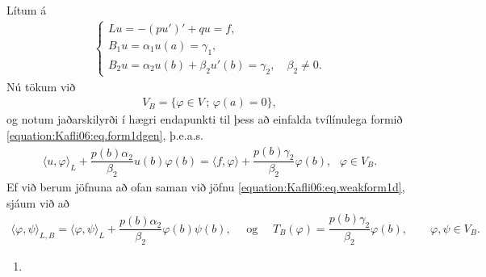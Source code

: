 \documentclass[a4paper,10pt,icelandic]{sphinxmanual}
\begin{document}
Lítum á
\begin{equation*}
\begin{split}\begin{cases}
Lu=-(pu')'+qu=f, \\
B_1u=\alpha_1u(a)=\gamma_1,  \\
B_2u=\alpha_2u(b)+{\beta}_2u'(b)=\gamma_2, \quad \beta_2\neq 0.
\end{cases}\end{split}
\end{equation*}
Nú tökum við
\begin{equation*}
\begin{split}V_B=\{\varphi\in V\,;\, \varphi(a)=0\},\end{split}
\end{equation*}
og notum jaðarskilyrði í hægri endapunkti til þess að einfalda tvílínulega formið \eqref{equation:Kafli06:eq.form1dgen}, þ.e.a.s.
\begin{equation*}
\begin{split}{{\langle u,\varphi\rangle}}_L
+\dfrac{p(b)\alpha_2}{\beta_2}u(b)\varphi(b)
={{\langle f,\varphi\rangle}}
+\dfrac{p(b)\gamma_2}{\beta_2}\varphi(b), ~~~ \varphi\in V_B.\end{split}
\end{equation*}
Ef við berum jöfnuna að ofan saman við jöfnu \eqref{equation:Kafli06:eq.weakform1d},  sjáum við að
\begin{equation*}
\begin{split}{{\langle \varphi,\psi\rangle}}_{L,B}={{\langle \varphi,\psi\rangle}}_L
+\dfrac{p(b)\alpha_2}{\beta_2}\varphi(b)\psi(b),
\quad \text{ og } \quad
T_B(\varphi)=
\dfrac{p(b)\gamma_2}{\beta_2}\varphi(b),
\qquad \varphi,\psi\in V_B.\end{split}
\end{equation*}\begin{enumerate}
\def\theenumi{\Roman{enumi}}
\def\labelenumi{\theenumi .}
\makeatletter\def\p@enumii{\p@enumi \theenumi .}\makeatother
\setcounter{enumi}{2}
\item {} 

\end{enumerate}
\end{document}
